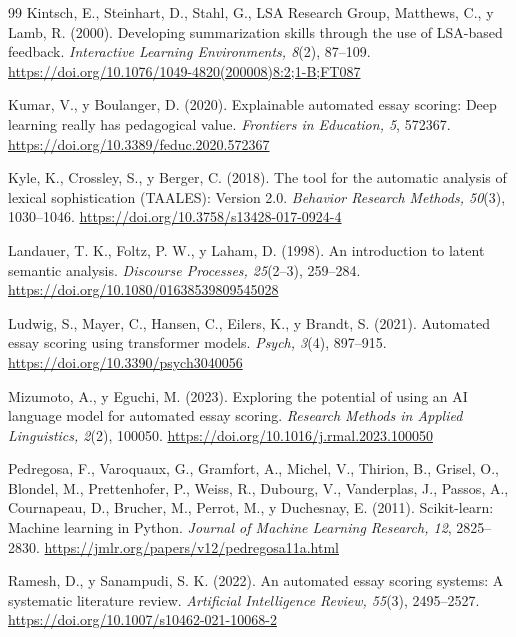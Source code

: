 \documentclass[11pt,a4paper]{article}
\begin{document}
\begin{thebibliography}{99}
Kintsch, E., Steinhart, D., Stahl, G., LSA Research Group, Matthews, C., y Lamb, R. (2000). Developing summarization skills through the use of LSA-based feedback. \textit{Interactive Learning Environments, 8}(2), 87--109. \url{https://doi.org/10.1076/1049-4820(200008)8:2;1-B;FT087}

Kumar, V., y Boulanger, D. (2020). Explainable automated essay scoring: Deep learning really has pedagogical value. \textit{Frontiers in Education, 5}, 572367. \url{https://doi.org/10.3389/feduc.2020.572367}

Kyle, K., Crossley, S., y Berger, C. (2018). The tool for the automatic analysis of lexical sophistication (TAALES): Version 2.0. \textit{Behavior Research Methods, 50}(3), 1030--1046. \url{https://doi.org/10.3758/s13428-017-0924-4}

Landauer, T. K., Foltz, P. W., y Laham, D. (1998). An introduction to latent semantic analysis. \textit{Discourse Processes, 25}(2--3), 259--284. \url{https://doi.org/10.1080/01638539809545028}

Ludwig, S., Mayer, C., Hansen, C., Eilers, K., y Brandt, S. (2021). Automated essay scoring using transformer models. \textit{Psych, 3}(4), 897--915. \url{https://doi.org/10.3390/psych3040056}

Mizumoto, A., y Eguchi, M. (2023). Exploring the potential of using an AI language model for automated essay scoring. \textit{Research Methods in Applied Linguistics, 2}(2), 100050. \url{https://doi.org/10.1016/j.rmal.2023.100050}

Pedregosa, F., Varoquaux, G., Gramfort, A., Michel, V., Thirion, B., Grisel, O., Blondel, M., Prettenhofer, P., Weiss, R., Dubourg, V., Vanderplas, J., Passos, A., Cournapeau, D., Brucher, M., Perrot, M., y Duchesnay, E. (2011). Scikit-learn: Machine learning in Python. \textit{Journal of Machine Learning Research, 12}, 2825--2830. \url{https://jmlr.org/papers/v12/pedregosa11a.html}

Ramesh, D., y Sanampudi, S. K. (2022). An automated essay scoring systems: A systematic literature review. \textit{Artificial Intelligence Review, 55}(3), 2495--2527. \url{https://doi.org/10.1007/s10462-021-10068-2}


\end{thebibliography}
\end{document}
